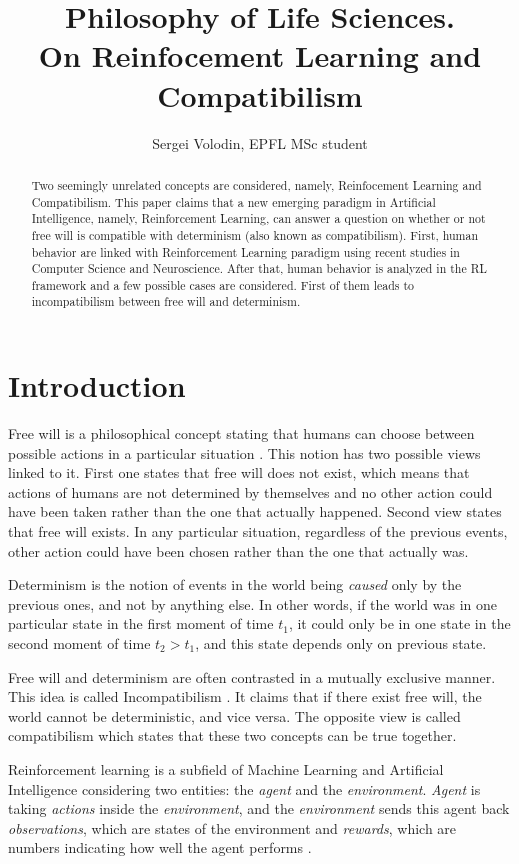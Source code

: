 \documentclass[a4paper]{article}
\title{Philosophy of Life Sciences.\\ On Reinfocement Learning and Compatibilism}
\author{Sergei Volodin, EPFL MSc student}
\date{}
\begin{document}
\maketitle

\begin{abstract}
Two seemingly unrelated concepts are considered, namely, Reinfocement Learning and Compatibilism. This paper claims that a new emerging paradigm in Artificial Intelligence, namely, Reinforcement Learning, can answer a question on whether or not free will is compatible with determinism (also known as compatibilism).
First, human behavior are linked with Reinforcement Learning paradigm using recent studies in Computer Science and Neuroscience.
After that, human behavior is analyzed in the RL framework and a few possible cases are considered. First of them leads to incompatibilism between free will and determinism.
\end{abstract}

\section{Introduction}
Free will is a philosophical concept stating that humans can choose between possible actions in a particular situation \cite{freewillst}. This notion has two possible views linked to it. First one states that free will does not exist, which means that actions of humans are not determined by themselves and no other action could have been taken rather than the one that actually happened. Second view states that free will exists. In any particular situation, regardless of the previous events, other action could have been chosen rather than the one that actually was.

Determinism \cite{determinismst} is the notion of events in the world being {\em caused} only by the previous ones, and not by anything else. In other words, if the world was in one particular state in the first moment of time $t_1$, it could only be in one state in the second moment of time $t_2>t_1$, and this state depends only on previous state.

Free will and determinism are often contrasted in a mutually exclusive manner. This idea is called Incompatibilism \cite{compatibilismst}. It claims that if there exist free will, the world cannot be deterministic, and vice versa. The opposite view is called compatibilism which states that these two concepts can be true together.

Reinforcement learning is a subfield of Machine Learning and Artificial Intelligence considering two entities: the {\em agent} and the {\em environment}. {\em Agent} is taking {\em actions} inside the {\em environment}, and the {\em environment} sends this agent back {\em observations}, which are states of the environment and {\em rewards}, which are numbers indicating how well the agent performs \cite{sutton}.
\end{document}
